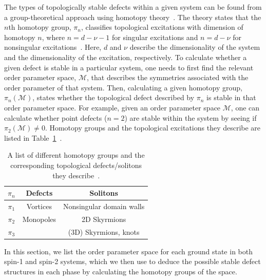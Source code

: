 The types of topologically stable defects within a given system can be
found from a group-theoretical approach using homotopy theory~\cite{Mermin1979,
Kawaguchi2012}.
The theory states that the \(n\)th homotopy group, \(\pi_n\), classifies
topological excitations with dimension of homotopy \(n\), where
\(n = d - \nu - 1\) for singular excitations and \(n=d - \nu \) for nonsingular
excitations~\cite{Kobayashi2012}.
Here, \(d\) and \(\nu \) describe the dimensionality of the system and the
dimensionality of the excitation, respectively.
To calculate whether a given defect is stable in a particular system, one needs
to first find the relevant order parameter space, \(\mathcal{M}\), that
describes the symmetries associated with the order parameter of that system.
Then, calculating a given homotopy group, \(\pi_n(\mathcal{M})\), states whether
the topological defect described by \(\pi_n\) is stable in that order parameter
space.
For example, given an order parameter space \(\mathcal{M}\), one can calculate
whether point defects (\(n=2\)) are stable within the system by seeing if
\(\pi_2(\mathcal{M}) \neq 0\).
Homotopy groups and the topological excitations they describe are listed in
Table~\ref{tab: homotopy-groups}~\cite{Kawaguchi2012}.
\begin{table}
    \centering
    \begin{tabular}{ccc}
        \toprule
        \(\pi_n\) & Defects & Solitons \\
        \midrule
        \(\pi_1 \) & Vortices & Nonsingular domain walls \\
        \(\pi_2 \) & Monopoles & 2D Skyrmions \\
        \(\pi_3 \) &  & (3D) Skyrmions, knots \\
        \bottomrule
    \end{tabular}
    \caption[Homotopy groups and the topological excitations they describe]
    {\label{tab: homotopy-groups}A list of different homotopy groups
    and the corresponding topological defects/solitons they
    describe~\cite{Kawaguchi2012}.}
\end{table}

In this section, we list the order parameter space for each ground state
in both spin-1 and spin-2 systems, which we then use to deduce the possible
stable defect structures in each phase by calculating the homotopy groups of the
space.

